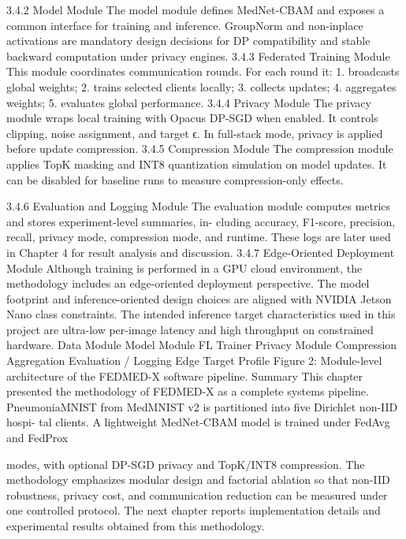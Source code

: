3.4.2
Model Module
The model module defines MedNet-CBAM and exposes a common interface for training and inference. GroupNorm and non-inplace activations are mandatory design decisions for DP compatibility and stable backward computation under privacy engines.
3.4.3
Federated Training Module
This module coordinates communication rounds. For each round it:
1. broadcasts global weights; 2. trains selected clients locally; 3. collects updates; 4. aggregates weights; 5. evaluates global performance.
3.4.4
Privacy Module
The privacy module wraps local training with Opacus DP-SGD when enabled.
It controls clipping, noise assignment, and target ϵ. In full-stack mode, privacy is applied before update compression.
3.4.5
Compression Module
The compression module applies TopK masking and INT8 quantization simulation on model updates. It can be disabled for baseline runs to measure compression-only effects.

3.4.6
Evaluation and Logging Module
The evaluation module computes metrics and stores experiment-level summaries, in- cluding accuracy, F1-score, precision, recall, privacy mode, compression mode, and runtime. These logs are later used in Chapter 4 for result analysis and discussion.
3.4.7
Edge-Oriented Deployment Module
Although training is performed in a GPU cloud environment, the methodology includes an edge-oriented deployment perspective. The model footprint and inference-oriented design choices are aligned with NVIDIA Jetson Nano class constraints. The intended inference target characteristics used in this project are ultra-low per-image latency and high throughput on constrained hardware.
Data Module
Model Module
FL Trainer
Privacy Module
Compression
Aggregation
Evaluation / Logging
Edge Target Profile
Figure 2: Module-level architecture of the FEDMED-X software pipeline.
Summary
This chapter presented the methodology of FEDMED-X as a complete systems pipeline.
PneumoniaMNIST from MedMNIST v2 is partitioned into five Dirichlet non-IID hospi- tal clients. A lightweight MedNet-CBAM model is trained under FedAvg and FedProx

modes, with optional DP-SGD privacy and TopK/INT8 compression. The methodology emphasizes modular design and factorial ablation so that non-IID robustness, privacy cost, and communication reduction can be measured under one controlled protocol.
The next chapter reports implementation details and experimental results obtained from this methodology.

